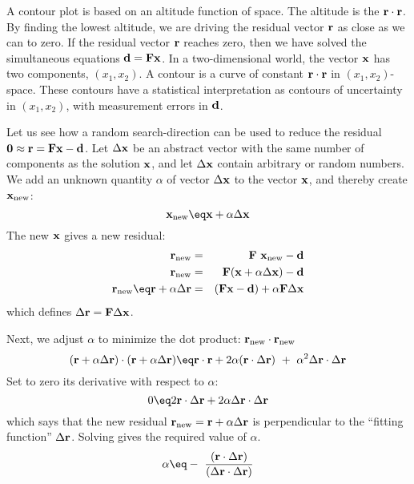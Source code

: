 \par
A contour plot is based on an altitude function of space.
The altitude is the   $\bold r \cdot \bold r$.
By finding the lowest altitude,
we are driving the residual vector  $\bold r$  as close as we can to zero.
If the residual vector  $\bold r$  reaches zero, then we have solved
the simultaneous equations  $\bold d= \bold F \bold x$.
In a two-dimensional world, the vector  $\bold x$  has two components,
$(x_1,x_2)$.
A contour is a curve of constant
$\bold r \cdot \bold r$  in $(x_1 , x_2 )$-space.
These contours have a statistical interpretation as contours
of uncertainty in $(x_1 , x_2 )$, with measurement errors in $\bold d$.
\par
Let us see how a random search-direction
can be used to reduce the residual
$\bold 0\approx \bold r= \bold F \bold x - \bold d$.
Let $\Delta \bold x$ be an abstract vector
with the same number of components as the solution $\bold x$,
and let $\Delta \bold x$ contain arbitrary or random numbers.
We add an unknown quantity $\alpha$
of vector $\Delta \bold x$ to the vector $\bold x$,
and thereby create $\bold x_{\rm new}$:
\begin{equation}
\bold x_{\rm new} \eq \bold x+\alpha \Delta \bold x
\label{eqn:oldx}
\end{equation}
The new $\bold x$ gives a new residual:
\begin{eqnarray}
\bold r_{\rm new} &=& \bold F\ \bold x_{\rm new}           -\bold d \\
\bold r_{\rm new} &=& \bold F( \bold x+\alpha\Delta\bold x)-\bold d\\
\bold r_{\rm new} \eq
\bold r+\alpha \Delta\bold r
                  &=& (\bold F \bold x-\bold d)
                                                +\alpha\bold F\Delta\bold x 
\label{eqn:resupdatelin}
\end{eqnarray}
which defines $\Delta \bold r = \bold F \Delta \bold x$.

\par
Next, we adjust $\alpha$ to minimize the dot product:
$ \bold r_{\rm new} \cdot \bold r_{\rm new} $
\begin{equation}
(\bold r+\alpha\Delta \bold r)\cdot (\bold r+\alpha\Delta \bold r) \eq
\bold r\cdot \bold r + 2\alpha (\bold r \cdot \Delta \bold r) \ +\ 
\alpha^2 \Delta \bold r \cdot \Delta \bold r
\label{eqn:mindot}
\end{equation}
Set to zero its derivative with respect to  $\alpha$:
\begin{equation}
0\eq 
2 \bold r \cdot \Delta \bold r  + 2\alpha \Delta \bold r \cdot \Delta \bold r
\label{eqn:newresperp}
\end{equation}
which says that
the new residual $\bold r_{\rm new} = \bold r + \alpha \Delta \bold r$ is
perpendicular to the ``fitting function'' $\Delta \bold r$.
Solving gives the required value of $\alpha$.
\begin{equation}
\alpha \eq - \ { (\bold r \cdot \Delta \bold r ) \over
( \Delta \bold r \cdot \Delta \bold r ) }
\label{eqn:alfa}
\end{equation}

